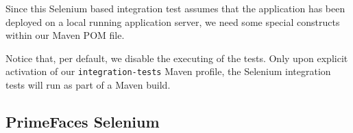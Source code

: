 Since this Selenium based integration test assumes that the application has been deployed on a local running application server, we need some special constructs within our Maven POM file.

Notice that, per default, we disable the executing of the tests.
Only upon explicit activation of our \texttt{integration-tests} Maven profile,
the Selenium integration tests will run as part of a Maven build.

\subsection{PrimeFaces Selenium}

